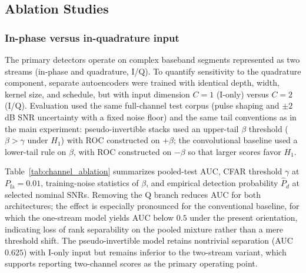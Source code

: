 
\subsection{Ablation Studies}

\subsubsection{In-phase versus in-quadrature input}
The primary detectors operate on complex baseband segments represented as two streams (in-phase and quadrature, I/Q). To quantify sensitivity to the quadrature component, separate autoencoders were trained with identical depth, width, kernel size, and schedule, but with input dimension $C\!=\!1$ (I-only) versus $C\!=\!2$ (I/Q). Evaluation used the same full-channel test corpus (pulse shaping and $\pm2$\,dB SNR uncertainty with a fixed noise floor) and the same tail conventions as in the main experiment: pseudo-invertible stacks used an upper-tail $\beta$ threshold ($\beta>\gamma$ under $H_1$) with ROC constructed on $+\beta$; the convolutional baseline used a lower-tail rule on $\beta$, with ROC constructed on $-\beta$ so that larger scores favor $H_1$.

Table~\ref{tab:channel_ablation} summarizes pooled-test AUC, CFAR threshold $\gamma$ at $P_{\mathrm{fa}}\!=\!0.01$, training-noise statistics of $\beta$, and empirical detection probability $\hat{P}_d$ at selected nominal SNRs. Removing the Q branch reduces AUC for both architectures; the effect is especially pronounced for the conventional baseline, for which the one-stream model yields AUC below $0.5$ under the present orientation, indicating loss of rank separability on the pooled mixture rather than a mere threshold shift. The pseudo-invertible model retains nontrivial separation (AUC $0.625$) with I-only input but remains inferior to the two-stream variant, which supports reporting two-channel scores as the primary operating point.


